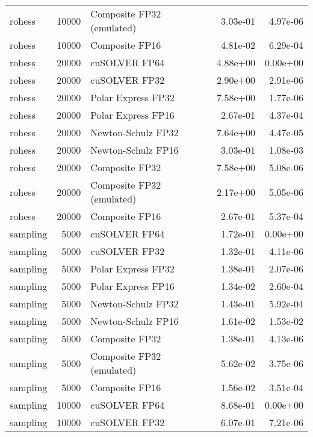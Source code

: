 \begin{table}
\begin{tabular}{lrlrr}
   rohess & 10000 & Composite FP32 (emulated) &  3.03e-01 &        4.97e-06 \\
   rohess & 10000 &            Composite FP16 &  4.81e-02 &        6.29e-04 \\
   rohess & 20000 &             cuSOLVER FP64 &  4.88e+00 &        0.00e+00 \\
   rohess & 20000 &             cuSOLVER FP32 &  2.90e+00 &        2.91e-06 \\
   rohess & 20000 &        Polar Express FP32 &  7.58e+00 &        1.77e-06 \\
   rohess & 20000 &        Polar Express FP16 &  2.67e-01 &        4.37e-04 \\
   rohess & 20000 &        Newton-Schulz FP32 &  7.64e+00 &        4.47e-05 \\
   rohess & 20000 &        Newton-Schulz FP16 &  3.03e-01 &        1.08e-03 \\
   rohess & 20000 &            Composite FP32 &  7.58e+00 &        5.08e-06 \\
   rohess & 20000 & Composite FP32 (emulated) &  2.17e+00 &        5.05e-06 \\
   rohess & 20000 &            Composite FP16 &  2.67e-01 &        5.37e-04 \\
 sampling &  5000 &             cuSOLVER FP64 &  1.72e-01 &        0.00e+00 \\
 sampling &  5000 &             cuSOLVER FP32 &  1.32e-01 &        4.11e-06 \\
 sampling &  5000 &        Polar Express FP32 &  1.38e-01 &        2.07e-06 \\
 sampling &  5000 &        Polar Express FP16 &  1.34e-02 &        2.60e-04 \\
 sampling &  5000 &        Newton-Schulz FP32 &  1.43e-01 &        5.92e-04 \\
 sampling &  5000 &        Newton-Schulz FP16 &  1.61e-02 &        1.53e-02 \\
 sampling &  5000 &            Composite FP32 &  1.38e-01 &        4.13e-06 \\
 sampling &  5000 & Composite FP32 (emulated) &  5.62e-02 &        3.75e-06 \\
 sampling &  5000 &            Composite FP16 &  1.56e-02 &        3.51e-04 \\
 sampling & 10000 &             cuSOLVER FP64 &  8.68e-01 &        0.00e+00 \\
 sampling & 10000 &             cuSOLVER FP32 &  6.07e-01 &        7.21e-06 \\

\end{tabular}
\end{table}
